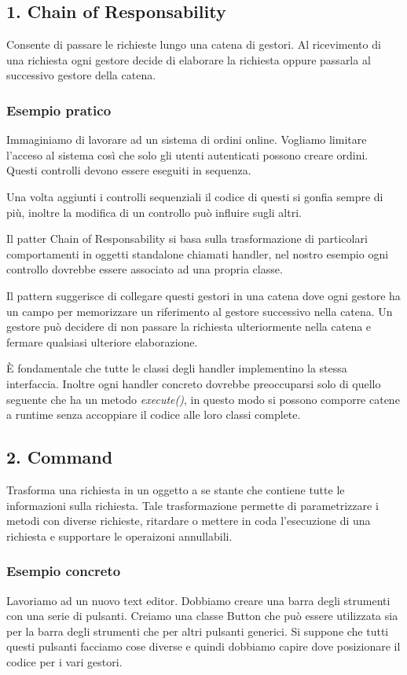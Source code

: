 \documentclass{report}
\begin{document}
\subsection*{1. Chain of Responsability}
Consente di passare le richieste lungo una catena di gestori. Al ricevimento di una richiesta ogni gestore decide di elaborare la richiesta oppure passarla al successivo gestore della catena.

\subsubsection*{Esempio pratico}
Immaginiamo di lavorare ad un sistema di ordini online. Vogliamo limitare l'acceso al sistema così che solo gli utenti autenticati possono creare ordini. Questi controlli devono essere eseguiti in sequenza.

\noindent
Una volta aggiunti i controlli sequenziali il codice di questi si gonfia sempre di più, inoltre la modifica di un controllo può influire sugli altri.

\medskip
\noindent
Il patter Chain of Responsability si basa sulla trasformazione di particolari comportamenti in oggetti standalone chiamati handler, nel nostro esempio ogni controllo dovrebbe essere associato ad una propria classe.

\noindent
Il pattern suggerisce di collegare questi gestori in una catena dove ogni gestore ha un campo per memorizzare un riferimento al gestore successivo nella catena. Un gestore può decidere di non passare la richiesta ulteriormente nella catena e fermare qualsiasi ulteriore elaborazione.

\smallskip
\noindent
\`E fondamentale che tutte le classi degli handler implementino la stessa interfaccia. Inoltre ogni handler concreto dovrebbe preoccuparsi solo di quello seguente che ha un metodo \textit{execute()}, in questo modo si possono comporre catene a runtime senza accoppiare il codice alle loro classi complete.

\subsection*{2. Command}
Trasforma una richiesta in un oggetto a se stante che contiene tutte le informazioni sulla richiesta. Tale trasformazione permette di parametrizzare i metodi con diverse richieste, ritardare o mettere in coda l'esecuzione di una richiesta e supportare le operaizoni annullabili.

\subsubsection*{Esempio concreto}
Lavoriamo ad un nuovo text editor. Dobbiamo creare una barra degli strumenti con una serie di pulsanti. Creiamo una classe Button che può essere utilizzata sia per la barra degli strumenti che per altri pulsanti generici. Si suppone che tutti questi pulsanti facciamo cose diverse e quindi dobbiamo capire dove posizionare il codice per i vari gestori.
\end{document}
